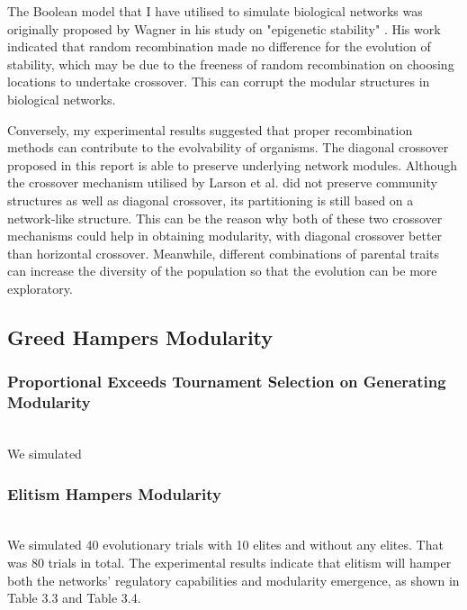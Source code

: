 The Boolean model that I have utilised to simulate biological networks was originally proposed by Wagner in his study on "epigenetic stability" \cite{wagner1996does}. His work indicated that random recombination made no difference for the evolution of stability, which may be due to the freeness of random recombination on choosing locations to undertake crossover. This can corrupt the modular structures in biological networks.

Conversely, my experimental results suggested that proper recombination methods can contribute to the evolvability of organisms. The diagonal crossover proposed in this report is able to preserve underlying network modules. Although the crossover mechanism utilised by Larson et al. did not preserve community structures as well as diagonal crossover, its partitioning is still based on a network-like structure. This can be the reason why both of these two crossover mechanisms could help in obtaining modularity, with diagonal crossover better than horizontal crossover. Meanwhile, different combinations of parental traits can increase the diversity of the population so that the evolution can be more exploratory.

\subsection{Greed Hampers Modularity}
\subsubsection{Proportional Exceeds Tournament Selection on Generating Modularity}~\\
We simulated 
\subsubsection{Elitism Hampers Modularity}~\\
We simulated 40 evolutionary trials with 10 elites and without any elites. That was 80 trials in total. The experimental results indicate that elitism will hamper both the networks' regulatory capabilities and modularity emergence, as shown in Table 3.3 and Table 3.4.